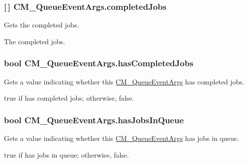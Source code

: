 \subsubsection[{completed\+Jobs}]{ \mbox{[}$\,$\mbox{]} C\+M\+\_\+\+Queue\+Event\+Args.\+completed\+Jobs\hspace{0.3cm}{\ttfamily [get]}}\label{class_c_m___queue_event_args_a89e1c990b52231168f5534204edfa25a}


Gets the completed jobs. 

The completed jobs.\hypertarget{class_c_m___queue_event_args_afa1760a1c067cea569209cf7458d1e5b}{}
\subsubsection[{has\+Completed\+Jobs}]{\setlength{\rightskip}{0pt plus 5cm}bool C\+M\+\_\+\+Queue\+Event\+Args.\+has\+Completed\+Jobs\hspace{0.3cm}{\ttfamily [get]}}\label{class_c_m___queue_event_args_afa1760a1c067cea569209cf7458d1e5b}


Gets a value indicating whether this \hyperlink{class_c_m___queue_event_args}{C\+M\+\_\+\+Queue\+Event\+Args} has completed jobs. 

{\ttfamily true} if has completed jobs; otherwise, {\ttfamily false}.\hypertarget{class_c_m___queue_event_args_abc07a71f168a798661e040ad0f824591}{}
\subsubsection[{has\+Jobs\+In\+Queue}]{\setlength{\rightskip}{0pt plus 5cm}bool C\+M\+\_\+\+Queue\+Event\+Args.\+has\+Jobs\+In\+Queue\hspace{0.3cm}{\ttfamily [get]}}\label{class_c_m___queue_event_args_abc07a71f168a798661e040ad0f824591}


Gets a value indicating whether this \hyperlink{class_c_m___queue_event_args}{C\+M\+\_\+\+Queue\+Event\+Args} has jobs in queue. 

{\ttfamily true} if has jobs in queue; otherwise, {\ttfamily false}.\hypertarget{class_c_m___queue_event_args_a9a7016a83b4d77bfede3932565c13704}{}
